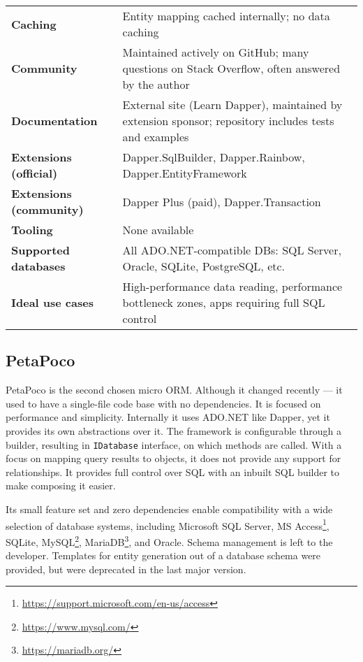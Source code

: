 \begin{table}[H]
\begin{tabular}{|l|l|}
\textbf{Caching} & Entity mapping cached internally; no data caching \\
\textbf{Community} & Maintained actively on GitHub; many questions on Stack Overflow, often answered by the author \\
\textbf{Documentation} & External site (Learn Dapper), maintained by extension sponsor; repository includes tests and examples \\
\textbf{Extensions (official)} & Dapper.SqlBuilder, Dapper.Rainbow, Dapper.EntityFramework \\
\textbf{Extensions (community)} & Dapper Plus (paid), Dapper.Transaction \\
\textbf{Tooling} & None available \\
\textbf{Supported databases} & All ADO.NET-compatible DBs: SQL Server, Oracle, SQLite, PostgreSQL, etc. \\
\textbf{Ideal use cases} & High-performance data reading, performance bottleneck zones, apps requiring full SQL control \\
\bottomrule
\end{tabular}
\end{table}

\subsection{PetaPoco}\label{sec:feat_petapoco}

PetaPoco\cite{PetaPoco} is the second chosen micro ORM. Although it changed recently --- it used to have a single-file code base with no dependencies. It is focused on performance and simplicity. Internally it uses ADO.NET like Dapper, yet it provides its own abstractions over it. The framework is configurable through a builder, resulting in \texttt{IDatabase} interface, on which methods are called. With a focus on mapping query results to objects, it does not provide any support for relationships. It provides full control over SQL with an inbuilt SQL builder to make composing it easier. 

Its small feature set and zero dependencies enable compatibility with a wide selection of database systems, including Microsoft SQL Server, MS Access\footnote{\url{https://support.microsoft.com/en-us/access}}, SQLite, MySQL\footnote{\url{https://www.mysql.com/}}, MariaDB\footnote{\url{https://mariadb.org/}}, and Oracle. Schema management is left to the developer. Templates for entity generation out of a database schema were provided, but were deprecated in the last major version.

